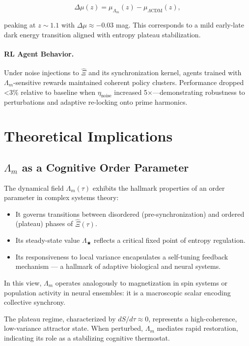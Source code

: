 \documentclass{article}
\theoremstyle{plain}
\theoremstyle{claimstyle}
\begin{document}
\begin{equation}
\Delta \mu(z) = \mu_{\Lambda_m}(z) - \mu_{\Lambda\text{CDM}}(z),
\end{equation}

peaking at $z \sim 1.1$ with $\Delta \mu \approx -0.03$ mag. This corresponds to a mild early-late dark energy transition aligned with entropy plateau stabilization.

\paragraph{RL Agent Behavior.} Under noise injections to $\hat{\Xi}$ and its synchronization kernel, agents trained with $\Lambda_m$-sensitive rewards maintained coherent policy clusters. Performance dropped <3\% relative to baseline when $\eta_{\text{noise}}$ increased 5×—demonstrating robustness to perturbations and adaptive re-locking onto prime harmonics.


\section{Theoretical Implications}

\subsection{$\Lambda_m$ as a Cognitive Order Parameter}

The dynamical field $\Lambda_m(\tau)$ exhibits the hallmark properties of an order parameter in complex systems theory:

\begin{itemize}
    \item It governs transitions between disordered (pre-synchronization) and ordered (plateau) phases of $\hat{\Xi}(\tau)$.
    \item Its steady-state value $\Lambda_★$ reflects a critical fixed point of entropy regulation.
    \item Its responsiveness to local variance encapsulates a self-tuning feedback mechanism — a hallmark of adaptive biological and neural systems.
\end{itemize}

In this view, $\Lambda_m$ operates analogously to magnetization in spin systems or population activity in neural ensembles: it is a macroscopic scalar encoding collective synchrony.

The plateau regime, characterized by $dS/d\tau \approx 0$, represents a high-coherence, low-variance attractor state. When perturbed, $\Lambda_m$ mediates rapid restoration, indicating its role as a stabilizing cognitive thermostat.
\end{document}

